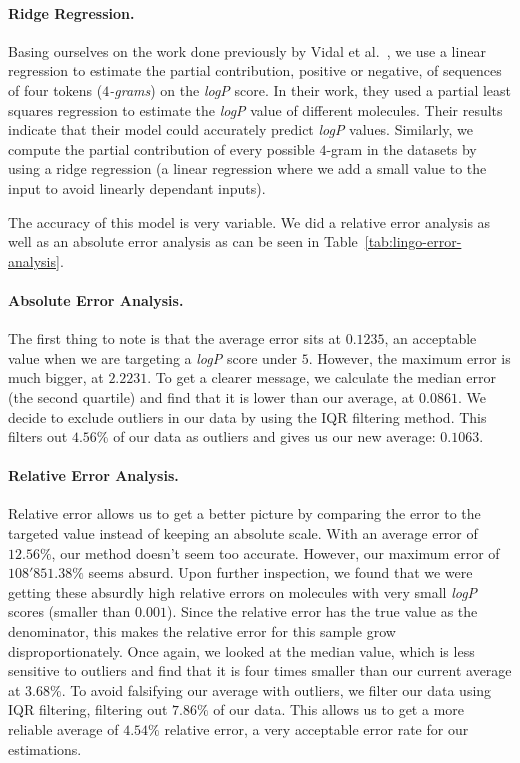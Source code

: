 \documentclass[../Document.tex]{subfiles}
\begin{document}
\paragraph{Ridge Regression.}
Basing ourselves on the work done previously by Vidal et al.~\cite{lingos}, we use a linear regression to estimate the partial contribution, positive or negative, of sequences of four tokens (\emph{$4$-grams}) on the \emph{logP} score.
In their work, they used a partial least squares regression to estimate the \emph{logP} value of different molecules.
Their results indicate that their model could accurately predict \emph{logP} values.
Similarly, we compute the partial contribution of every possible $4$-gram in the datasets by using a ridge regression (a linear regression where we add a small value to the input to avoid linearly dependant inputs).

The accuracy of this model is very variable. We did a relative error analysis as well as an absolute error analysis as can be seen in Table~\ref{tab:lingo-error-analysis}.

\paragraph{Absolute Error Analysis.} The first thing to note is that the average error sits at $0.1235$, an acceptable value when we are targeting a \emph{logP} score under $5$. However, the maximum error is much bigger, at $2.2231$. To get a clearer message, we calculate the median error (\ie the second quartile) and find that it is lower than our average, at $0.0861$. We decide to exclude outliers in our data by using the IQR filtering method. This filters out $4.56\%$ of our data as outliers and gives us our new average: $0.1063$.

\paragraph{Relative Error Analysis.} Relative error allows us to get a better picture by comparing the error to the targeted value instead of keeping an absolute scale. 
With an average error of $12.56\%$, our method doesn't seem too accurate.
However, our maximum error of $108'851.38\%$ seems absurd.
Upon further inspection, we found that we were getting these absurdly high relative errors on molecules with very small \emph{logP} scores (\ie smaller than $0.001$).
Since the relative error has the true value as the denominator, this makes the relative error for this sample grow disproportionately.
Once again, we looked at the median value, which is less sensitive to outliers and find that it is four times smaller than our current average at $3.68\%$.
To avoid falsifying our average with outliers, we filter our data using IQR filtering, filtering out $7.86\%$ of our data.
This allows us to get a more reliable average of $4.54\%$ relative error, a very acceptable error rate for our estimations.
\end{document}
